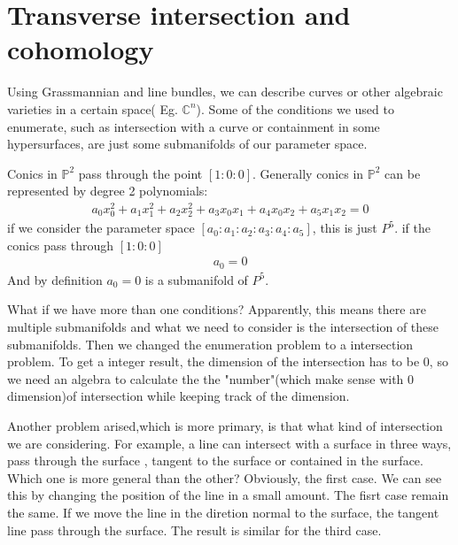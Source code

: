 \documentclass{article}
\begin{document}
 
\newpage
\section{Transverse intersection and cohomology}
Using Grassmannian and line bundles, we can describe curves or other algebraic varieties 
in a certain space( Eg. $\mathbb{C}^{n}$). Some of the conditions we used to enumerate, such as intersection
with a curve or containment in some hypersurfaces, are just some submanifolds of our parameter space.

\begin{eg}
    Conics in $\mathbb{P}^{2}$ pass through the point $[1:0:0]$. 
    Generally conics in $\mathbb{P}^{2}$ can be represented by degree 2 polynomials:
    \begin{align*}
        a_{0}x_{0}^{2}+a_{1}x_{1}^{2}+ a_{2}x_{2}^{2} + a_{3}x_{0}x_{1}+ a_{4}x_{0}x_{2}+a_{5}x_{1}x_{2}=0
    \end{align*}
    if we consider the parameter space $[a_{0}:a_{1}:a_{2}:a_{3}:a_{4}:a_{5}]$, this is just $P^{5}$.
    if the conics pass through $[1:0:0]$
    \begin{align*}
        a_{0}=0
    \end{align*}
    And by definition ${a_{0}= 0}$ is a submanifold of $P^{5}$.

\end{eg}

What if we have more than one conditions? Apparently, this means there are multiple submanifolds and 
what we need to consider is the intersection of these submanifolds. Then we changed the enumeration problem
to a intersection problem. To get a integer result, the dimension of the intersection has to be $0$, 
so we need an algebra to calculate the the "number"(which make sense with $0$ dimension)of intersection while keeping
track of the dimension. 

Another problem arised,which is more primary, is that what kind of intersection we are considering.
For example, a line can intersect with a surface in three ways, pass through the surface , tangent to the surface or contained
in the surface. Which one is more general than the other? Obviously, the first case. We can see this by changing the
position of the line in a small amount. The fisrt case remain the same. If we move the line in the diretion normal
to the surface, the tangent line pass through the surface. The result is similar for the third case.
\end{document}
